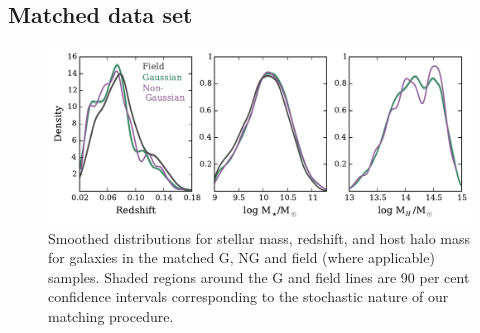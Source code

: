 \documentclass[a4paper,fleqn,usenatbib]{mnras}
\begin{document}
\subsection{Matched data set}
\label{sec:match}

\begin{figure}
  \centering
  \includegraphics[width=\textwidth]{dist_m2_s.pdf}
  \caption{Smoothed distributions for stellar mass, redshift, and host
    halo mass for galaxies in the matched G, NG and field (where
    applicable) samples.  Shaded regions around the G and field lines
    are 90 per cent confidence intervals corresponding to the
    stochastic nature of our matching procedure.}
  \label{fig:dist_m2_s}
\end{figure}
\end{document}
